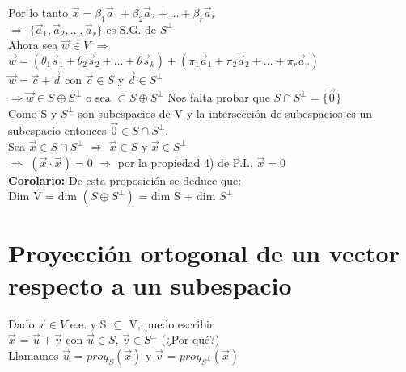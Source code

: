 \documentclass[11pt]{article}
\begin{document}
Por lo tanto $\vec{x} = \beta_1\vec{a}_1+\beta_2\vec{a}_2+\hdots+\beta_r\vec{a}_r$ \\
$\Rightarrow$ $\{\vec{a}_1,\vec{a}_2,\hdots,\vec{a}_r\}$ es S.G. de $S^{\perp}$\\
Ahora sea $\vec{w} \in V$ $\Rightarrow$\\
$\vec{w} = (\theta_1\vec{s}_1 + \theta_2\vec{s}_2+\hdots+\theta\vec{s}_k)+(\pi_1\vec{a}_1+\pi_2\vec{a}_2+\hdots+\pi_r\vec{a}_r)$\\
$\vec{w}=\vec{c}+\vec{d}$ con $\vec{c} \in S$ y $\vec{d} \in S^{\perp}$\\
$\Rightarrow \vec{w} \in S \oplus S^{\perp}$ o sea $ \subset S \oplus S^{\perp}$
Nos falta probar que $S \cap S^{\perp} = \{\vec{0}\}$\\
Como S y $S^{\perp}$ son subespacios de V y la intersección de subespacios es un subespacio entonces $\vec{0} \in S \cap S^{\perp}$.\\
Sea $\vec{x} \in S \cap S^{\perp}$ $\Rightarrow$ $\vec{x} \in S$ y $\vec{x} \in S^{\perp}$\\
$\Rightarrow$ $(\vec{x} \cdot \vec{x}) = 0$
$\Rightarrow$ por la propiedad 4) de P.I., $\vec{x} = 0$\\
\textbf{Corolario:} De esta proposición se deduce que: \\
Dim V = dim $(S \oplus S^{\perp})$ = dim S + dim $S^{\perp}$
\section{Proyección ortogonal de un vector respecto a un subespacio}
Dado $\vec{x} \in V$ e.e. y S $\subseteq$ V, puedo escribir\\
$\vec{x}$ = $\vec{u} + \vec{v}$ con $\vec{u} \in S$, $\vec{v} \in S^{\perp}$ (¿Por qué?)\\
Llamamos $\vec{u}$ = $proy_S(\vec{x})$ y $\vec{v}$ = $proy_{S^{\perp}}(\vec{x})$
\end{document}
